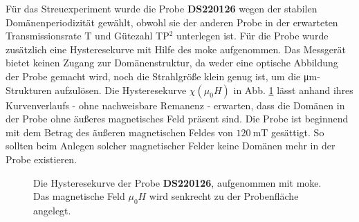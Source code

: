 \noindent
Für das Streuexperiment wurde die Probe \textbf{DS220126} wegen der stabilen Domänenperiodizität gewählt, obwohl sie der anderen Probe in der erwarteten Transmissionsrate $\text{T}$ und Gütezahl TP$^2$ unterlegen ist. Für die Probe wurde zusätzlich eine Hysteresekurve mit Hilfe des \gls{moke} aufgenommen. Das Messgerät bietet keinen Zugang zur Domänenstruktur, da weder eine optische Abbildung der Probe gemacht wird, noch die Strahlgröße klein genug ist, um die \si{\micro\meter}-Strukturen aufzulösen. Die Hysteresekurve $\chi(\mu_0 H)$ in Abb. \ref{fig:hysterese_sample} lässt anhand ihres Kurvenverlaufs - ohne nachweisbare Remanenz - erwarten, dass die Domänen in der Probe ohne äußeres magnetisches Feld präsent sind. Die Probe ist beginnend mit dem Betrag des äußeren magnetischen Feldes von $\SI{120}{\milli\tesla}$ gesättigt. So sollten beim Anlegen solcher magnetischer Felder keine Domänen mehr in der Probe existieren.
\begin{figure}[H]
    \centering
    
    \caption{Die Hysteresekurve der Probe \textbf{DS220126}, aufgenommen mit \gls{moke}. Das magnetische Feld $\mu_0 H$ wird senkrecht zu der Probenfläche angelegt.}
    \label{fig:hysterese_sample}
\end{figure}
\newpage


